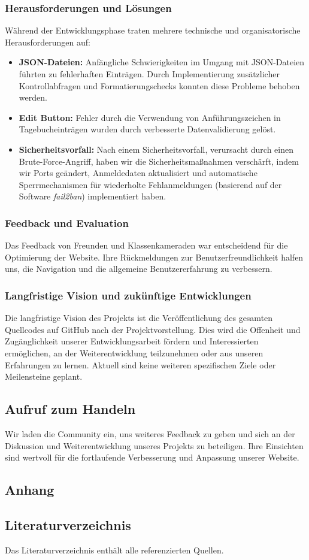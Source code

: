 \subsubsection{Herausforderungen und Lösungen}
Während der Entwicklungsphase traten mehrere technische und organisatorische Herausforderungen auf:
\begin{itemize}
    \item \textbf{JSON-Dateien:} Anfängliche Schwierigkeiten im Umgang mit JSON-Dateien führten zu fehlerhaften Einträgen. Durch Implementierung zusätzlicher Kontrollabfragen und Formatierungschecks konnten diese Probleme behoben werden.
    \item \textbf{Edit Button:} Fehler durch die Verwendung von Anführungszeichen in Tagebucheinträgen wurden durch verbesserte Datenvalidierung gelöst.
    \item \textbf{Sicherheitsvorfall:} Nach einem Sicherheitsvorfall, verursacht durch einen Brute-Force-Angriff, haben wir die Sicherheitsmaßnahmen verschärft, indem wir Ports geändert, Anmeldedaten aktualisiert und automatische Sperrmechanismen für wiederholte Fehlanmeldungen (basierend auf der Software \textit{fail2ban}) implementiert haben.
\end{itemize}

\subsubsection{Feedback und Evaluation}
Das Feedback von Freunden und Klassenkameraden war entscheidend für die Optimierung der Website. Ihre Rückmeldungen zur Benutzerfreundlichkeit halfen uns, die Navigation und die allgemeine Benutzererfahrung zu verbessern.

\subsubsection{Langfristige Vision und zukünftige Entwicklungen}
Die langfristige Vision des Projekts ist die Veröffentlichung des gesamten Quellcodes auf GitHub nach der Projektvorstellung. Dies wird die Offenheit und Zugänglichkeit unserer Entwicklungsarbeit fördern und Interessierten ermöglichen, an der Weiterentwicklung teilzunehmen oder aus unseren Erfahrungen zu lernen. Aktuell sind keine weiteren spezifischen Ziele oder Meilensteine geplant.

\subsection{Aufruf zum Handeln}
Wir laden die Community ein, uns weiteres Feedback zu geben und sich an der Diskussion und Weiterentwicklung unseres Projekts zu beteiligen. Ihre Einsichten sind wertvoll für die fortlaufende Verbesserung und Anpassung unserer Website.

\subsection{Anhang}


\subsection{Literaturverzeichnis}
Das Literaturverzeichnis enthält alle referenzierten Quellen.
